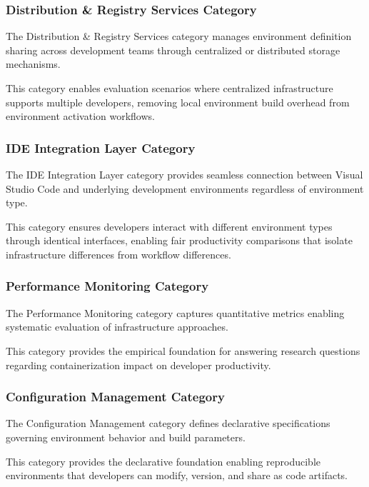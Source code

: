 \subsubsection{Distribution \& Registry Services Category}

The Distribution \& Registry Services category manages environment definition sharing across development teams through centralized or distributed storage mechanisms.

This category enables evaluation scenarios where centralized infrastructure supports multiple developers, removing local environment build overhead from environment activation workflows.

\subsubsection{IDE Integration Layer Category}

The IDE Integration Layer category provides seamless connection between Visual Studio Code and underlying development environments regardless of environment type.

This category ensures developers interact with different environment types through identical interfaces, enabling fair productivity comparisons that isolate infrastructure differences from workflow differences.

\subsubsection{Performance Monitoring Category}

The Performance Monitoring category captures quantitative metrics enabling systematic evaluation of infrastructure approaches.

This category provides the empirical foundation for answering research questions regarding containerization impact on developer productivity.

\subsubsection{Configuration Management Category}

The Configuration Management category defines declarative specifications governing environment behavior and build parameters.

This category provides the declarative foundation enabling reproducible environments that developers can modify, version, and share as code artifacts.

